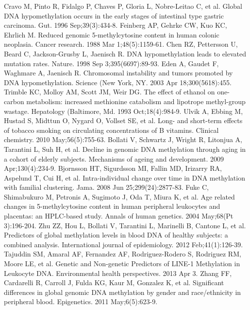 \begin{thebibliography}{12} 
		Cravo M, Pinto R, Fidalgo P, Chaves P, Gloria L, Nobre-Leitao C, et al. Global DNA hypomethylation occurs in the early stages of intestinal type gastric carcinoma. Gut. 1996 Sep;39(3):434-8. 
		Feinberg AP, Gehrke CW, Kuo KC, Ehrlich M. Reduced genomic 5-methylcytosine content in human colonic neoplasia. Cancer research. 1988 Mar 1;48(5):1159-61. 
		Chen RZ, Pettersson U, Beard C, Jackson-Grusby L, Jaenisch R. DNA hypomethylation leads to elevated mutation rates. Nature. 1998 Sep 3;395(6697):89-93. 
		Eden A, Gaudet F, Waghmare A, Jaenisch R. Chromosomal instability and tumors promoted by DNA hypomethylation. Science (New York, NY. 2003 Apr 18;300(5618):455. 
		Trimble KC, Molloy AM, Scott JM, Weir DG. The effect of ethanol on one-carbon metabolism: increased methionine catabolism and lipotrope methyl-group wastage. Hepatology (Baltimore, Md. 1993 Oct;18(4):984-9. 
		Ulvik A, Ebbing M, Hustad S, Midttun O, Nygard O, Vollset SE, et al. Long- and short-term effects of tobacco smoking on circulating concentrations of B vitamins. Clinical chemistry. 2010 May;56(5):755-63. 
		Bollati V, Schwartz J, Wright R, Litonjua A, Tarantini L, Suh H, et al. Decline in genomic DNA methylation through aging in a cohort of elderly subjects. Mechanisms of ageing and development. 2009 Apr;130(4):234-9. 
		Bjornsson HT, Sigurdsson MI, Fallin MD, Irizarry RA, Aspelund T, Cui H, et al. Intra-individual change over time in DNA methylation with familial clustering. Jama. 2008 Jun 25;299(24):2877-83. 
		Fuke C, Shimabukuro M, Petronis A, Sugimoto J, Oda T, Miura K, et al. Age related changes in 5-methylcytosine content in human peripheral leukocytes and placentas: an HPLC-based study. Annals of human genetics. 2004 May;68(Pt 3):196-204. 
		Zhu ZZ, Hou L, Bollati V, Tarantini L, Marinelli B, Cantone L, et al. Predictors of global methylation levels in blood DNA of healthy subjects: a combined analysis. International journal of epidemiology. 2012 Feb;41(1):126-39. 
		Tajuddin SM, Amaral AF, Fernandez AF, Rodriguez-Rodero S, Rodriguez RM, Moore LE, et al. Genetic and Non-genetic Predictors of LINE-1 Methylation in Leukocyte DNA. Environmental health perspectives. 2013 Apr 3. 
		Zhang FF, Cardarelli R, Carroll J, Fulda KG, Kaur M, Gonzalez K, et al. Significant differences in global genomic DNA methylation by gender and race/ethnicity in peripheral blood. Epigenetics. 2011 May;6(5):623-9. 

\end{thebibliography}
